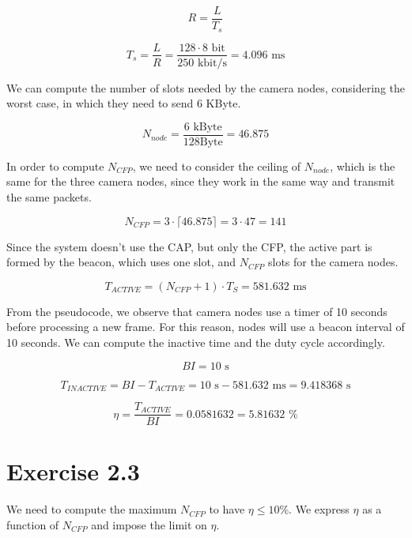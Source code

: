 \begin{equation}
R = \frac{L}{T_{s}}
\end{equation}

\begin{equation}
T_{s} = \frac{L}{R} = \frac{128 \cdot 8\text{ bit}}{250\text{ kbit/s}} = 4.096\text{ ms}
\end{equation}

We can compute the number of slots needed by the camera nodes, considering the worst case, in which they need to send 6 KByte.

\begin{equation}
N_{node} = \frac{6 \text{ kByte}}{128 \text {Byte}} = 46.875
\end{equation}

In order to compute $N_{CFP}$, we need to consider the ceiling of $N_{node}$, which is the same for the three camera nodes, since they work in the same way and transmit the same packets.

\begin{equation}
N_{CFP} = 3 \cdot \lceil 46.875 \rceil = 3 \cdot 47 = 141
\end{equation}

Since the system doesn't use the CAP, but only the CFP, the active part is formed by the beacon, which uses one slot, and $N_{CFP}$ slots for the camera nodes.

\begin{equation}
T_{ACTIVE} = (N_{CFP} + 1) \cdot T_S = 581.632 \text{ ms}
\end{equation}

From the pseudocode, we observe that camera nodes use a timer of 10 seconds before processing a new frame. For this reason, nodes will use a beacon interval of 10 seconds. We can compute the inactive time and the duty cycle accordingly.

\begin{equation}
BI = 10\text{ s}
\end{equation}

\begin{equation}
T_{INACTIVE} = BI - T_{ACTIVE} = 10\text{ s} - 581.632 \text{ ms} = 9.418368\text{ s}
\end{equation}

\begin{equation}
\eta = \frac{T_{ACTIVE}}{BI} = 0.0581632 = 5.81632\text{ \%}
\end{equation}

\section{Exercise 2.3}
We need to compute the maximum $N_{CFP}$ to have $\eta \leq 10 \%$. We express $\eta$ as a function of $N_{CFP}$ and impose the limit on $\eta$.

